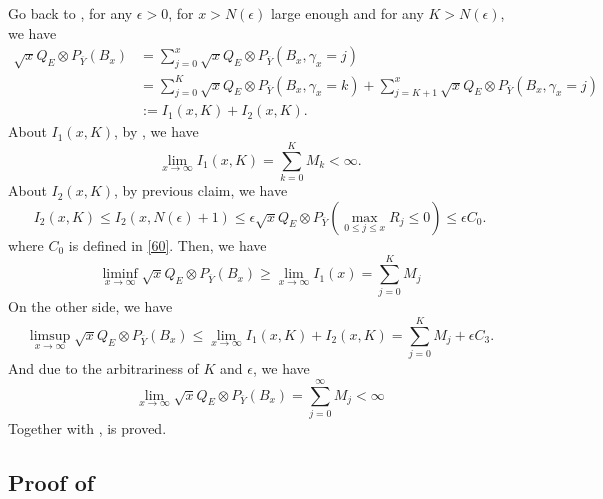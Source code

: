 \documentclass[]{article}
\makeatletter
\numberwithin{equation}{section}
\renewenvironment{proof}[1][\proofname]{%
	\par\pushQED{\qed}\normalfont%
	\topsep6\p@\@plus6\p@\relax
	\trivlist\item[\hskip\labelsep\bfseries#1\@addpunct{.}]%
	\ignorespaces
}{%
	\popQED\endtrivlist\@endpefalse
}
\theoremstyle{thmstyleone}%
\theoremstyle{thmstyletwo}%
\theoremstyle{thmstylethree}%
\theoremstyle{thmstylefour}%
\theoremstyle{thmstylefive}%
\theoremstyle{thmstylesix}%
\makeatother
\begin{document}
\begin{proof}[Proof of \Cref{Theorem of intermediately cases}]
		Go back to , for any $\epsilon>0$, for $x>N(\epsilon)$ large enough and for any $K>N(\epsilon)$, we have
		\begin{align}
			\sqrt{x}Q_E\otimes P_{\overline{Y}} (B_x)
			&=
			\sum_{j=0}^{x} \sqrt{x}Q_E\otimes P_{\overline{Y}} (B_x,\gamma_x =j)
			\nonumber\\
			&=
			\sum_{j=0}^{K} \sqrt{x}Q_E\otimes P_{\overline{Y}} (B_x,\gamma_x = k)
			+
			\sum_{j=K+1}^{x} \sqrt{x}Q_E\otimes P_{\overline{Y}} (B_x,\gamma_x = j)
			\nonumber\\
			&:=I_1(x,K)+I_2(x,K).\nonumber
		\end{align}
		About $I_1(x,K)$, by , we have
		\begin{equation*}
			\lim\limits_{x\rightarrow\infty}I_1(x,K) = \sum_{k=0}^{K} M_k<\infty.
		\end{equation*}
		About $I_2(x,K)$, by previous claim, we have
		\begin{equation*}
			I_2(x,K)\leqslant I_2(x,N(\epsilon)+1) \leqslant \epsilon \sqrt{x} Q_E\otimes P_{\overline{Y}}
			\left(
			\max_{0\leqslant j\leqslant x} R_j \leqslant 0
			\right)\leqslant \epsilon C_0.
		\end{equation*}
		where $C_0$ is defined in \cref{60}.
		Then, we have
		\begin{equation*}
			\liminf\limits_{x\rightarrow\infty}\sqrt{x}Q_E\otimes P_{\overline{Y}} (B_x)
			\geqslant
			\lim\limits_{x\rightarrow\infty} I_1(x) = 
			\sum_{j=0}^{K} M_j
		\end{equation*}
		On the other side, we have
		\begin{equation*}
			\limsup\limits_{x\rightarrow\infty}\sqrt{x}Q_E\otimes P_{\overline{Y}} (B_x)
			\leqslant
			\lim\limits_{x\rightarrow\infty} I_1(x,K) +I_2(x,K) = 
			\sum_{j=0}^{K} M_j +\epsilon C_3.
		\end{equation*}
		And due to the arbitrariness of $K$ and $\epsilon$, we have
		\begin{equation*}
			\lim\limits_{x\rightarrow\infty}\sqrt{x}Q_E\otimes P_{\overline{Y}} (B_x)
			= 
			\sum_{j=0}^{\infty} M_j<\infty
		\end{equation*}
		Together with ,  is proved.
	\end{proof}
	
	
	\subsection{Proof of }
	
\end{document}
